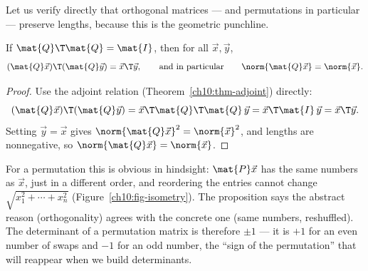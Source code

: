 Let us verify directly that orthogonal matrices --- and permutations in particular --- preserve
lengths, because this is the geometric punchline.

\begin{proposition}\label{ch10:prop-isometry}
If $\mat{Q}\T\mat{Q}=\mat{I}$, then for all $\vec{x},\vec{y}$,
\[
  (\mat{Q}\vec{x})\T(\mat{Q}\vec{y}) = \vec{x}\T\vec{y},
  \qquad\text{and in particular}\qquad
  \norm{\mat{Q}\vec{x}} = \norm{\vec{x}}.
\]
\end{proposition}

\begin{proof}
Use the adjoint relation (Theorem~\ref{ch10:thm-adjoint}) directly:
\[
  (\mat{Q}\vec{x})\T(\mat{Q}\vec{y})
  = \vec{x}\T\mat{Q}\T\mat{Q}\,\vec{y}
  = \vec{x}\T\mat{I}\,\vec{y}
  = \vec{x}\T\vec{y}.
\]
Setting $\vec{y}=\vec{x}$ gives $\norm{\mat{Q}\vec{x}}^2=\norm{\vec{x}}^2$, and lengths are
nonnegative, so $\norm{\mat{Q}\vec{x}}=\norm{\vec{x}}$.
\end{proof}

For a permutation this is obvious in hindsight: $\mat{P}\vec{x}$ has the same numbers as $\vec{x}$,
just in a different order, and reordering the entries cannot change $\sqrt{x_1^2+\cdots+x_n^2}$
(Figure~\ref{ch10:fig-isometry}). The
proposition says the abstract reason (orthogonality) agrees with the concrete one (same numbers,
reshuffled). The determinant of a permutation matrix is therefore $\pm 1$ --- it is $+1$ for an even
number of swaps and $-1$ for an odd number, the ``sign of the permutation'' that will reappear when
we build determinants.

